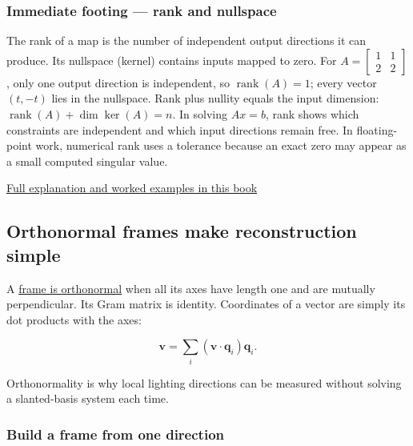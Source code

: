 \subsubsection{Immediate footing --- rank and nullspace}\label{01-foundations-i-ch017-immediate-footing-rank-and-nullspace}

\hypertarget{01-foundations-i-ch017-immediate-footing-rank-and-nullspace}{}

The rank of a map is the number of independent output directions it can produce. Its nullspace (kernel) contains inputs mapped to zero. For \(A=\begin{bmatrix}1&1\\2&2\end{bmatrix}\), only one output direction is independent, so \(\operatorname{rank}(A)=1\); every vector \((t,-t)\) lies in the nullspace. Rank plus nullity equals the input dimension: \(\operatorname{rank}(A)+\dim\ker(A)=n\). In solving \(Ax=b\), rank shows which constraints are independent and which input directions remain free. In floating-point work, numerical rank uses a tolerance because an exact zero may appear as a small computed singular value.

\hyperref[01-foundations-i-ch019-rank-the-four-spaces-and-the-shape-of-the-answer]{Full explanation and worked examples in this book}

\subsection{Orthonormal frames make reconstruction simple}\label{01-foundations-i-ch017-orthonormal-frames-make-reconstruction-simple}

\hypertarget{01-foundations-i-ch017-orthonormal-frames-make-reconstruction-simple}{}

A \hyperref[01-foundations-i-ch017-orthonormal-frames-make-reconstruction-simple]{frame is orthonormal} when all its axes have length one and are mutually perpendicular. Its Gram matrix is identity. Coordinates of a vector are simply its dot products with the axes:

\[
\mathbf v=\sum_i(\mathbf v\cdot\mathbf q_i)\mathbf q_i.
\]

Orthonormality is why local lighting directions can be measured without solving a slanted-basis system each time.

\subsubsection{Build a frame from one direction}\label{01-foundations-i-ch017-build-a-frame-from-one-direction}

